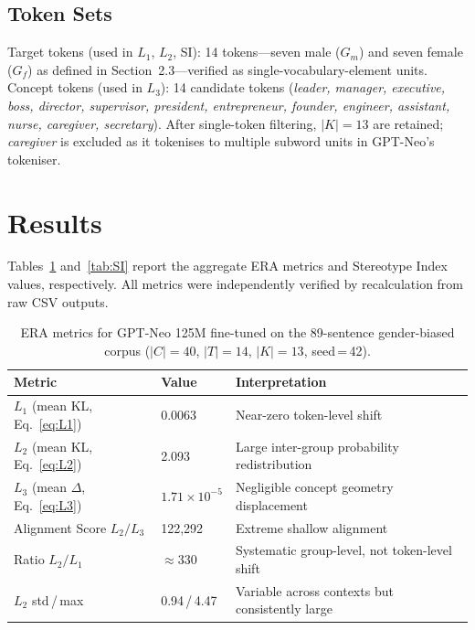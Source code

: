\documentclass[11pt,a4paper]{article}
\newcommand{\Gm}{G_m}
\newcommand{\Gf}{G_f}
\begin{document}
\subsection{Token Sets}

Target tokens (used in $L_1$, $L_2$, SI): 14 tokens---seven male ($\Gm$) and seven
female ($\Gf$) as defined in Section~2.3---verified as single-vocabulary-element units.
Concept tokens (used in $L_3$): 14 candidate tokens (\emph{leader, manager, executive,
boss, director, supervisor, president, entrepreneur, founder, engineer, assistant, nurse,
caregiver, secretary}). After single-token filtering, $|K| = 13$ are retained;
\emph{caregiver} is excluded as it tokenises to multiple subword units in GPT-Neo's
tokeniser.

\section{Results}

Tables~\ref{tab:metrics} and~\ref{tab:SI} report the aggregate ERA metrics and
Stereotype Index values, respectively. All metrics were independently verified by
recalculation from raw CSV outputs.

\begin{table}[ht]
\centering
\caption{ERA metrics for GPT-Neo 125M fine-tuned on the 89-sentence gender-biased
corpus ($|C|=40$, $|T|=14$, $|K|=13$, seed\,=\,42).}
\label{tab:metrics}
\setlength{\tabcolsep}{6pt}
\renewcommand{\arraystretch}{1.25}
\begin{tabularx}{\textwidth}{@{}lll@{}}
\toprule
\textbf{Metric} & \textbf{Value} & \textbf{Interpretation} \\
\midrule
$L_1$ (mean KL, Eq.~\ref{eq:L1})  & 0.0063  & Near-zero token-level shift \\
$L_2$ (mean KL, Eq.~\ref{eq:L2})  & 2.093   & Large inter-group probability redistribution \\
$L_3$ (mean $\Delta$, Eq.~\ref{eq:L3}) & $1.71\times10^{-5}$ & Negligible concept geometry displacement \\
Alignment Score $L_2/L_3$ & 122{,}292 & Extreme shallow alignment \\
Ratio $L_2/L_1$           & $\approx 330$ & Systematic group-level, not token-level shift \\
$L_2$ std\,/\,max         & 0.94\,/\,4.47 & Variable across contexts but consistently large \\
\bottomrule
\end{tabularx}
\end{table}
\end{document}

